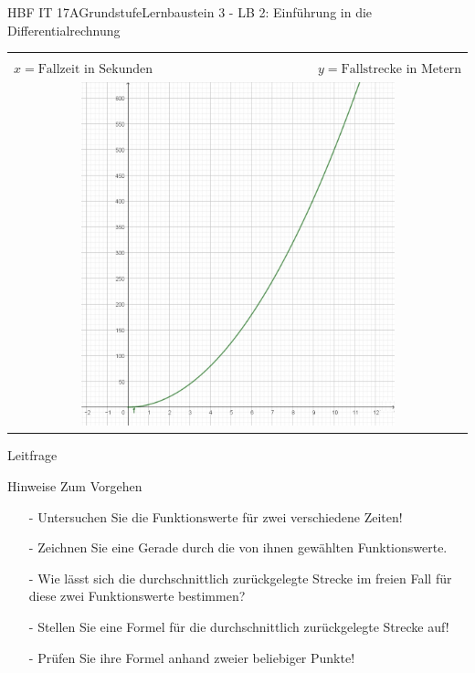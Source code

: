 \documentclass[oneside,openany,headings=optiontotoc,11pt,numbers=noenddot]{scrreprt}
\begin{document}
	\begin{worksheet}{HBF IT 17A}{Grundstufe}{Lernbaustein 3 - LB 2: Einführung in die Differentialrechnung}
		
		\noindent
		\begin{framed}
			\begin{center}
				\begin{tabular}{lcr}				
					\multicolumn{3}{c}{\fbox{\(f(x) = 5x^{2}\)}}\\
					\( x = \text{Fallzeit in Sekunden}\) &  & \( y = \text{Fallstrecke in Metern}\)\\
					\multicolumn{3}{c}{\includegraphics[width=0.7\textwidth]{Bilder/20180219-EinDiffFall.jpg}}
				\end{tabular}
			\end{center}
		\end{framed}

		\setlength{\fboxsep}{1mm}
		\begin{framed}
			\tiny{\color{codegray}Leitfrage}\\
			\par
			\bigskip
		\end{framed}
	
		\begin{framed}
			\tiny{\color{codegray}Hinweise Zum Vorgehen}
			\normalsize
			\color{black}
				\begin{itemize}
					\itemsep0em
					\item[-] Untersuchen Sie die Funktionswerte für zwei verschiedene Zeiten!
					\item[-] Zeichnen Sie eine Gerade durch die von ihnen gewählten Funktionswerte.
					\item[-] Wie lässt sich die durchschnittlich zurückgelegte Strecke im freien Fall für diese zwei Funktionswerte bestimmen?
					\item[-] Stellen Sie eine Formel für die durchschnittlich zurückgelegte Strecke auf!
					\item[-] Prüfen Sie ihre Formel anhand zweier beliebiger Punkte!
				\end{itemize}
		\end{framed}
	

\end{worksheet}
\end{document}
